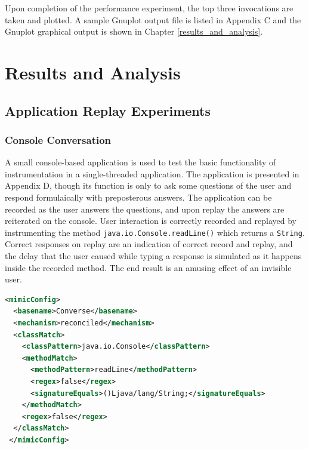 \documentclass[]{final_report}
\begin{document}
Upon completion of the performance experiment, the top three invocations are taken and plotted. A sample Gnuplot output file is listed in Appendix C and the Gnuplot graphical output is shown in Chapter \ref{results_and_analysis}.

\chapter{Results and Analysis \label{results_and_analysis}}

\section*{Application Replay Experiments}

\subsection*{Console Conversation \label{console_conversation}}

A small console-based application is used to test the basic functionality of instrumentation in a single-threaded application. The application is presented in Appendix D, though its function is only to ask some questions of the user and respond formulaically with preposterous answers. The application can be recorded as the user answers the questions, and upon replay the answers are reiterated on the console. User interaction is correctly recorded and replayed by instrumenting the method \lstinline{java.io.Console.readLine()} which returns a \lstinline{String}. Correct responses on replay are an indication of correct record and replay, and the delay that the user caused while typing a response is simulated as it happens inside the recorded method. The end result is an amusing effect of an invisible user.

\begin{lstlisting}[language=xml, caption=Mimic Configuration to Record and Replay a Console Conversation, label={converse_mimic_config}]
<mimicConfig>
  <basename>Converse</basename>
  <mechanism>reconciled</mechanism>
  <classMatch>
    <classPattern>java.io.Console</classPattern>
    <methodMatch>
      <methodPattern>readLine</methodPattern>
      <regex>false</regex>
      <signatureEquals>()Ljava/lang/String;</signatureEquals>
    </methodMatch>
    <regex>false</regex>
  </classMatch>
 </mimicConfig>
\end{lstlisting}
\end{document}
